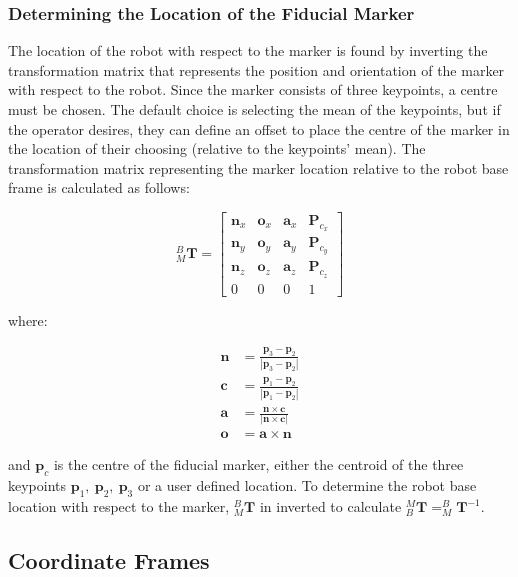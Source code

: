 \subsubsection{Determining the Location of the Fiducial Marker}

The location of the robot with respect to the marker is found by inverting the transformation matrix that represents the position and orientation of the marker with respect to the robot. Since the marker consists of three keypoints, a centre must be chosen. The default choice is selecting the mean of the keypoints, but if the operator desires, they can define an offset to place the centre of the marker in the location of their choosing (relative to the keypoints' mean). The transformation matrix representing the marker location relative to the robot base frame is calculated as follows:

\begin{equation}
    ^{B}_{M}\mathbf{T} = \begin{bmatrix}
    \mathbf{n}_x & \mathbf{o}_x & \mathbf{a}_x & \mathbf{P}_{c_x}\\
   \mathbf{n}_y & \mathbf{o}_y & \mathbf{a}_y & \mathbf{P}_{c_y}\\
   \mathbf{n}_z & \mathbf{o}_z & \mathbf{a}_z & \mathbf{P}_{c_z}\\
   0 & 0 & 0 & 1\end{bmatrix}\label{eq:1}
\end{equation}

\noindent where:

\begin{align}
    \mathbf{n} &= \frac{\mathbf{p}_3 - \mathbf{p}_2}{|\mathbf{p}_3 - \mathbf{p}_2|}\\
    \mathbf{c} &= \frac{\mathbf{p}_1 - \mathbf{p}_2}{|\mathbf{p}_1 - \mathbf{p}_2|}\\
    \mathbf{a} &= \frac{\mathbf{n}\times\mathbf{c}}{|\mathbf{n}\times\mathbf{c}|}\\
    \mathbf{o} &= \mathbf{a}\times\mathbf{n}
\end{align}

\noindent and $\mathbf{p}_c$ is the centre of the fiducial marker, either the centroid of the three keypoints $\mathbf{p}_1,\ \mathbf{p}_2,\ \mathbf{p}_3$ or a user defined location. To determine the robot base location with respect to the marker, $^{B}_{M}\mathbf{T}$ in inverted to calculate $^{M}_{B}\mathbf{T} = ^{B}_{M}\mathbf{T}^{-1}$.\\

\subsection{Coordinate Frames}

